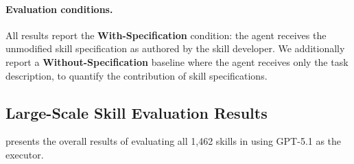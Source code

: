 \paragraph{Evaluation conditions.}
All results report the \textbf{With-Specification} condition: the agent receives the unmodified skill specification as authored by the skill developer.
We additionally report a \textbf{Without-Specification} baseline where the agent receives only the task description, to quantify the contribution of skill specifications.

\subsection{Large-Scale Skill Evaluation Results}
\label{ssec:main_results}

 presents the overall results of evaluating all 1,462 skills in \medskillbench using GPT-5.1 as the executor.

